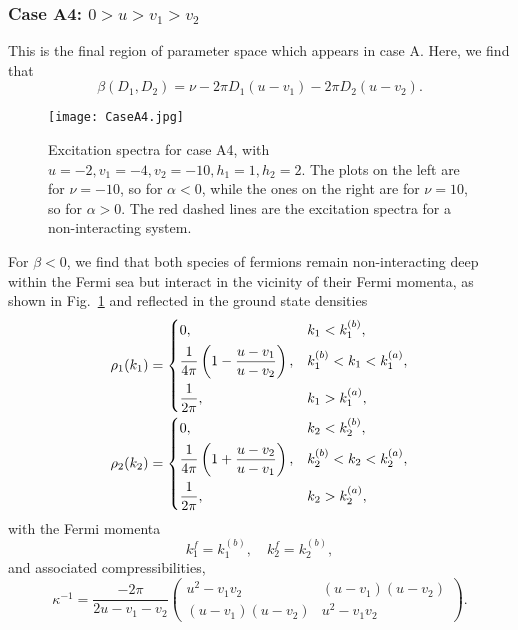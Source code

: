 \documentclass[aps,pra,
superscriptaddress,
reprint,twocolumn,preprintnumbers,
amsmath,amssymb,
nofootinbib]{revtex4-1}
\newcommand{\beq}{\begin{equation}}
\newcommand{\eeq}{\end{equation}}
\begin{document}
        \subsubsection{Case A4: $0>u>v_1>v_2$}
        \label{sec:A4}
        
This is the final region of parameter space which appears in case A. Here, we find that 
        \begin{equation}
        \beta(D_1,D_2) = \nu -2 \pi  D_1 \left(u-v_1\right)-2 \pi  D_2 \left(u-v_2\right).
        \end{equation}
           
  	\begin{figure}[t]
    \texttt{[image: CaseA4.jpg]}
    \centering
    \caption{\label{fig:08} Excitation spectra for case A4, with $u = -2,v_1 = -4,v_2 = -10,h_1 = 1,h_2 = 2$. The plots on the left are for $\nu = -10$, so for $\alpha<0$, while the ones on the right are for $\nu = 10$, so for $\alpha>0$. The red dashed lines are the excitation spectra for a non-interacting system.}
    \end{figure} 
       
    For $\beta<0$, we find that both species of fermions remain non-interacting deep within the Fermi sea but interact in the vicinity of their Fermi momenta, as shown in Fig.~\ref{fig:08} and reflected in the ground state densities    
        \begin{align}
        &\rho_1(k_1) = 
        \begin{dcases}
        0, &k_1<k_1^{(b)}, \\
        \frac{1}{4\pi} \left(1 - \frac{u - v_1}{u - v_2} \right), &k_1^{(b)}<k_1<k_1^{(a)}, \\
        \frac{1}{2\pi}, &k_1>k_1^{(a)},
        \end{dcases}\nonumber\\
        &\rho_2(k_2) = 
        \begin{dcases}
        0, &k_2<k_2^{(b)},\\
        \frac{1}{4\pi} \left(1 + \frac{u - v_2}{u - v_1} \right), &k_2^{(b)}<k_2<k_2^{(a)},\\
        \frac{1}{2\pi}, &k_2>k_2^{(a)},
        \end{dcases}
        \end{align}
with the Fermi momenta
\beq
k_1^f = k_1^{(b)},\quad k_2^f = k_2^{(b)}, 
\eeq
and associated compressibilities,
        \begin{equation}
        \kappa^{-1} = \frac{-2 \pi}{2u - v_1 - v_2} \left(
        \begin{array}{cc}
        u^2 - v_1 v_2 & (u - v_1)(u - v_2)\\
        (u - v_1)(u - v_2) & u^2 - v_1 v_2
        \end{array} \right).
        \end{equation}
        
\end{document}
